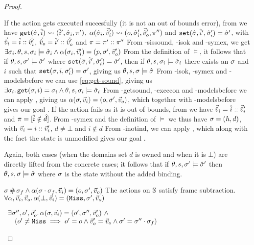 \begin{proof}
\begin{hypvlist}
 If the action gets executed succesfully (it is not an out of bounds error), from  we have $\texttt{get}(\hat{\sigma},\hat{i})\rightsquigarrow(\hat{i}',\hat{\sigma}_i,\pi')$, $\alpha(\hat{\sigma}_i,\vec{\hat{v}}_i')\rightsquigarrow(o,\hat{\sigma}'_i,\vec{\hat{v}}_o',\pi'')$ and ${\texttt{set}(\hat{\sigma},\hat{i}',\hat{\sigma}'_i)=\hat{\sigma}'}$, with $\vec{\hat{v}}_i=\hat{i}::\vec{\hat{v}}_i'$, $\vec{\hat{v}}_o=\hat{i}'::\vec{\hat{v}}_o'$ and $\pi=\pi'::\pi''$
 From \hyp{sissound}, \hyp{isok} and \hyp{symex}, we get $\exists \sigma_i\ldotp \theta,s,\sigma_i\models\hat{\sigma}_i \land \alpha(\sigma_i,\vec{v}_i')=(p,\sigma',\vec{v}_o')$
 From the definition of $\models$, it follows that if $\theta,s,\sigma'\models\hat{\sigma}'$ where $\texttt{set}(\hat{\sigma},\hat{i}',\hat{\sigma}'_i)=\hat{\sigma}'$, then if $\theta,s,\sigma_i\models\hat{\sigma}_i$ there exists an $\sigma$ and $i$ such that $\texttt{set}(\sigma,i,\sigma_i')=\sigma'$, giving us $\theta,s,\sigma\models\hat{\sigma}$
 From \hyp{isok}, \hyp{symex} and \hyp{modelsbefore} we can use \ref{eq:get-sound}, giving us ${\exists \sigma_i \ldotp \texttt{get}(\sigma, i)=\sigma_i} \land \theta,s,\sigma_i \models \hat{\sigma}_i$
 From \hyp{getsound}, \hyp{execcon} and \hyp{modelsbefore} we can apply , giving us ${\alpha(\sigma,\vec{v}_i)=(o,\sigma',\vec{v}_o)}$, which together with \hyp{modelsbefore} gives our goal .
 If the action fails as it is out of bounds, from  we have $\vec{\hat{v}}_i=\hat{i}::\vec{\hat{v}}_i'$ and $\pi=[\hat{i}\notin \hat{d}]$.
 From \hyp{symex} and the definition of $\models$ we thus have $\sigma=(h,d)$, with $\vec{v}_i=i::\vec{v}_i'$, $d\neq\bot$ and $i\notin d$
 From \hyp{inotind}, we can apply , which along with the fact the state is unmodified gives our goal .
\end{hypvlist}

\pfcase{$\alpha=\alloc$}

Again, both cases (when the domains set $d$ is owned and when it is $\bot$) are directly lifted from the concrete cases; it follows that if $\theta,s,\sigma'\models\hat{\sigma}'$ then $\theta,s,\sigma\models\hat{\sigma}$ where $\sigma$ is the state without the added binding.


\pfassume \begin{hypvlist}
 $\sigma\operatorname{\#}\sigma_f \land \alpha(\sigma\cdot\sigma_f,\vec{v}_i)=(o,\sigma',\vec{v}_o)$
 The actions on $\mathbb S$ satisfy frame subtraction.
 $\forall \alpha, \vec{v}_i, \vec{v}_o\ldotp \alpha(\bot,\vec{v}_i)=(\texttt{Miss},\sigma',\vec{v}_o)$
\end{hypvlist}
\pfprove \begin{goalvlist}
 $\begin{array}{l}
\exists \sigma'', o', \vec{v}_o'\ldotp \alpha(\sigma,\vec{v}_i)=(o', \sigma'', \vec{v}_o') ~\land \\
\quad(o' \neq \texttt{Miss} \implies o' = o \land  \vec{v}_o' = \vec{v}_o \land \sigma' = \sigma'' \cdot \sigma_f)
\end{array}$
\end{goalvlist}


\end{proof}
